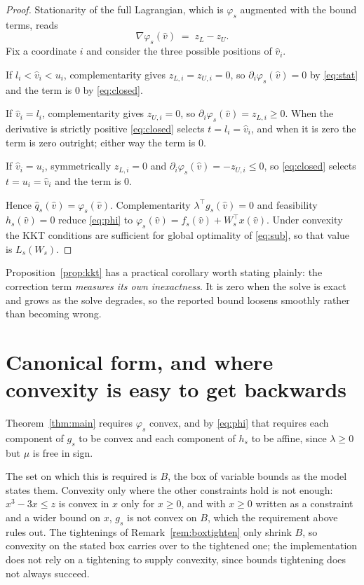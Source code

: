 \documentclass[11pt]{article}
\theoremstyle{plain}
\theoremstyle{remark}
\newcommand{\W}{W}
\newcommand{\vhat}{\hat{v}}
\newcommand{\qhat}{\hat{q}}
\begin{document}
\begin{proof}
Stationarity of the full Lagrangian, which is $\varphi_s$ augmented with the
bound terms, reads
\begin{equation}\label{eq:stat}
  \nabla \varphi_s(\vhat) \;=\; z_L - z_U .
\end{equation}
Fix a coordinate $i$ and consider the three possible positions of $\vhat_i$.

If $l_i < \vhat_i < u_i$, complementarity gives $z_{L,i} = z_{U,i} = 0$, so
$\partial_i \varphi_s(\vhat) = 0$ by \eqref{eq:stat} and the term is $0$ by
\eqref{eq:closed}.

If $\vhat_i = l_i$, complementarity gives $z_{U,i} = 0$, so
$\partial_i \varphi_s(\vhat) = z_{L,i} \ge 0$.  When the derivative is strictly
positive \eqref{eq:closed} selects $t = l_i = \vhat_i$, and when it is zero the
term is zero outright; either way the term is $0$.

If $\vhat_i = u_i$, symmetrically $z_{L,i} = 0$ and
$\partial_i \varphi_s(\vhat) = -z_{U,i} \le 0$, so \eqref{eq:closed} selects
$t = u_i = \vhat_i$ and the term is $0$.

Hence $\qhat_s(\vhat) = \varphi_s(\vhat)$.  Complementarity
$\lambda^{\top} g_s(\vhat) = 0$ and feasibility $h_s(\vhat) = 0$ reduce
\eqref{eq:phi} to $\varphi_s(\vhat) = f_s(\vhat) + \W_s^{\top} x(\vhat)$.  Under
convexity the KKT conditions are sufficient for global optimality of
\eqref{eq:sub}, so that value is $L_s(\W_s)$.
\end{proof}

Proposition~\ref{prop:kkt} has a practical corollary worth stating plainly: the
correction term \emph{measures its own inexactness}.  It is zero when the solve
is exact and grows as the solve degrades, so the reported bound loosens smoothly
rather than becoming wrong.

\section{Canonical form, and where convexity is easy to get backwards}
\label{sec:canonical}

Theorem~\ref{thm:main} requires $\varphi_s$ convex, and by \eqref{eq:phi} that
requires each component of $g_s$ to be convex and each component of $h_s$ to be
affine, since $\lambda \ge 0$ but $\mu$ is free in sign.

The set on which this is required is $B$, the box of variable bounds as the
model states them.  Convexity only where the other constraints hold is not
enough: $x^3 - 3x \le z$ is convex in $x$ only for $x \ge 0$, and with $x \ge 0$
written as a constraint and a wider bound on $x$, $g_s$ is not convex on $B$,
which the requirement above rules out.  The tightenings of Remark~\ref{rem:boxtighten} only shrink $B$, so convexity
on the stated box carries over to the tightened one; the implementation does not
rely on a tightening to supply convexity, since bounds tightening does not
always succeed.
\end{document}
